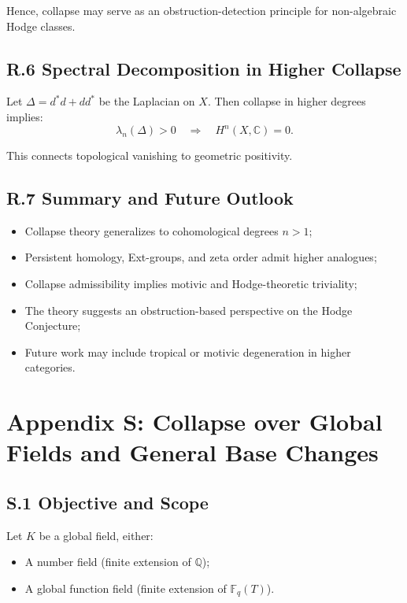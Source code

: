 \documentclass[11pt]{article}
\begin{document}
Hence, collapse may serve as an obstruction-detection principle for non-algebraic Hodge classes.

\subsection*{R.6 Spectral Decomposition in Higher Collapse}

Let \( \Delta = d^* d + d d^* \) be the Laplacian on \( X \). Then collapse in higher degrees implies:
\[
\lambda_n(\Delta) > 0 \quad \Rightarrow \quad H^n(X, \mathbb{C}) = 0.
\]

This connects topological vanishing to geometric positivity.

\subsection*{R.7 Summary and Future Outlook}

\begin{itemize}
  \item Collapse theory generalizes to cohomological degrees \( n > 1 \);
  \item Persistent homology, Ext-groups, and zeta order admit higher analogues;
  \item Collapse admissibility implies motivic and Hodge-theoretic triviality;
  \item The theory suggests an obstruction-based perspective on the Hodge Conjecture;
  \item Future work may include tropical or motivic degeneration in higher categories.
\end{itemize}



\appendix
\section*{Appendix S: Collapse over Global Fields and General Base Changes}

\subsection*{S.1 Objective and Scope}

Let \( K \) be a global field, either:

\begin{itemize}
  \item A number field (finite extension of \( \mathbb{Q} \));
  \item A global function field (finite extension of \( \mathbb{F}_q(T) \)).
\end{itemize}
\end{document}
